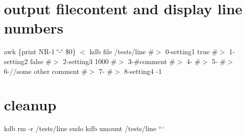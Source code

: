\section*{output filecontent and display line numbers}

awk \textquotesingle{}\{print N\+R-\/1 \char`\"{}-\/\char`\"{} \$0\}\textquotesingle{} $<$ {\ttfamily kdb file /tests/line} \#$>$ 0-\/setting1 true \#$>$ 1-\/setting2 false \#$>$ 2-\/setting3 1000 \#$>$ 3-\/\#comment \#$>$ 4-\/ \#$>$ 5-\/ \#$>$ 6-\///some other comment \#$>$ 7-\/ \#$>$ 8-\/setting4 -\/1

\section*{cleanup}

kdb rm -\/r /tests/line sudo kdb umount /tests/line ``` 